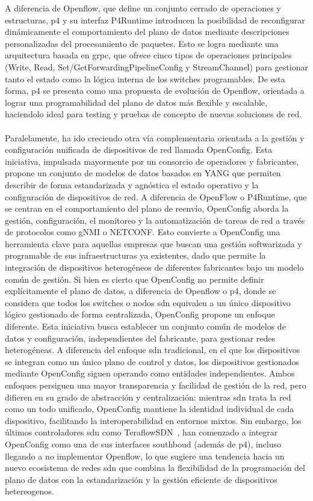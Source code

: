 A diferencia de Openflow, que define un conjunto cerrado de operaciones y estructuras, \gls{p4} y su interfaz P4Runtime introducen la posibilidad de reconfigurar dinámicamente el comportamiento del plano de datos mediante descripciones personalizadas del procesamiento de paquetes. Esto se logra mediante una arquitectura basada en \gls{grpc}, que ofrece cinco tipos de operaciones principales (Write, Read, Set/GetForwardingPipelineConfig y StreamChannel) para gestionar tanto el estado como la lógica interna de los switches programables. De esta forma, \gls{p4} se presenta como una propuesta de evolución de Openflow, orientada a lograr una programabilidad del plano de datos más flexible y escalable, haciendolo ideal para testing y pruebas de concepto de nuevas soluciones de red.\\
\\
Paralelamente, ha ido creciendo otra vía complementaria orientada a la gestión y configuración unificada de dispositivos de red llamada OpenConfig. Esta iniciativa, impulsada mayormente por un consorcio de operadores y fabricantes, propone un conjunto de modelos de datos basados en YANG que permiten describir de forma estandarizada y agnóstica el estado operativo y la configuración de dispositivos de red. A diferencia de OpenFlow o P4Runtime, que se centran en el comportamiento del plano de reenvío, OpenConfig aborda la gestión, configuración, el monitoreo y la automatización de tareas de red a través de protocolos como gNMI o NETCONF. Esto convierte a OpenConfig una herramienta clave para aquellas empresas que buscan una gestión softwarizada y programable de sus infraestructuras ya existentes, dado que permite la integración de dispositivos heterogéneos de diferentes fabricantes bajo un modelo común de gestión. Si bien es cierto que OpenConfig no permite definir explícitamente el plano de datos, a diferencia de Openflow o \gls{p4}, donde se considera que todos los switches o nodos \gls{sdn} equivalen a un único dispositivo lógico gestionado de forma centralizada, OpenConfig propone un enfoque diferente. Esta iniciativa busca establecer un conjunto común de modelos de datos y configuración, independientes del fabricante, para gestionar redes heterogéneas. A diferencia del enfoque \gls{sdn} tradicional, en el que los dispositivos se integran como un único plano de control y datos, los dispositivos gestionados mediante OpenConfig siguen operando como entidades independientes. Ambos enfoques persiguen una mayor transparencia y facilidad de gestión de la red, pero difieren en su grado de abstracción y centralización: mientras \gls{sdn} trata la red como un todo unificado, OpenConfig mantiene la identidad individual de cada dispositivo, facilitando la interoperabilidad en entornos mixtos. Sin embargo, los últimos controladores \gls{sdn} como TeraflowSDN~\cite{teraflowsdn2021}, han comenzado a integrar OpenConfig como una de sus interfaces southboud (además de \gls{p4}), incluso llegando a no implementar Openflow, lo que sugiere una tendencia hacia un nuevo ecosistema de redes \gls{sdn} que combina la flexibilidad de la programación del plano de datos con la estandarización y la gestión eficiente de dispositivos hetereogenos.\\
